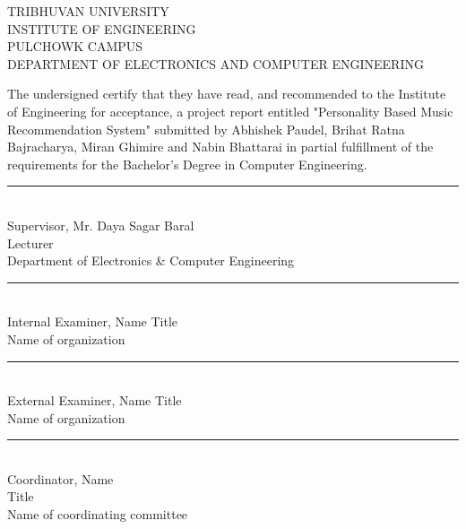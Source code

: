 
\newpage
\setcounter{page}{2}

\begin{center}
  TRIBHUVAN UNIVERSITY\\
  INSTITUTE OF ENGINEERING\\
  PULCHOWK CAMPUS\\
  DEPARTMENT OF ELECTRONICS AND COMPUTER ENGINEERING\\
\end{center}
The undersigned certify that they have read, and recommended to the Institute of Engineering for acceptance, a project report entitled "Personality Based Music Recommendation System" submitted by Abhishek Paudel, Brihat Ratna Bajracharya, Miran Ghimire and Nabin Bhattarai in partial fulfillment of the requirements for the Bachelor's Degree in Computer Engineering.\\[1.1cm]

\begin{minipage}{.60\textwidth}
\rule{1\textwidth}{1pt}\\
Supervisor, Mr. Daya Sagar Baral \\
Lecturer\\
Department of Electronics \& Computer Engineering\\[1.1cm]
\end{minipage}

\begin{minipage}{.60\textwidth}
\rule{1\textwidth}{1pt}\\
Internal Examiner, Name
Title\\
Name of organization\\[1.1cm]
\end{minipage}

\begin{minipage}{.60\textwidth}
\rule{1\textwidth}{1pt}\\
External Examiner, Name
Title\\
Name of organization\\[1.1cm]
\end{minipage}

\begin{minipage}{.60\textwidth}
\rule{1\textwidth}{1pt}\\
Coordinator, Name\\
Title\\
Name of coordinating committee\\[1cm]
\end{minipage}


